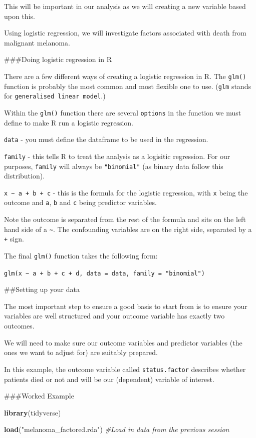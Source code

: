 \documentclass[]{book}
\makeatletter
\newenvironment{Shaded}{\begin{snugshade}}{\end{snugshade}}
\newcommand{\CommentTok}[1]{\textcolor[rgb]{0.56,0.35,0.01}{\textit{#1}}}
\newcommand{\KeywordTok}[1]{\textcolor[rgb]{0.13,0.29,0.53}{\textbf{#1}}}
\newcommand{\NormalTok}[1]{#1}
\newcommand{\StringTok}[1]{\textcolor[rgb]{0.31,0.60,0.02}{#1}}
\newenvironment{kframe}{%
\medskip{}
\setlength{\fboxsep}{.8em}
 \def\at@end@of@kframe{}%
 \ifinner\ifhmode%
  \def\at@end@of@kframe{\end{minipage}}%
  \begin{minipage}{\columnwidth}%
 \fi\fi%
 \def\FrameCommand##1{\hskip\@totalleftmargin \hskip-\fboxsep
 \colorbox{shadecolor}{##1}\hskip-\fboxsep
     \hskip-\linewidth \hskip-\@totalleftmargin \hskip\columnwidth}%
 \MakeFramed {\advance\hsize-\width
   \@totalleftmargin\z@ \linewidth\hsize
   \@setminipage}}%
 {\par\unskip\endMakeFramed%
 \at@end@of@kframe}
\renewenvironment{Shaded}{\begin{kframe}}{\end{kframe}}
\theoremstyle{definition}
\theoremstyle{definition}
\theoremstyle{definition}
\theoremstyle{remark}
\makeatother
\begin{document}
This will be important in our analysis as we will creating a new
variable based upon this.

Using logistic regression, we will investigate factors associated with
death from malignant melanoma.

\#\#\#Doing logistic regression in R

There are a few different ways of creating a logistic regression in R.
The \texttt{glm()} function is probably the most common and most
flexible one to use. (\texttt{glm} stands for
\texttt{generalised\ linear\ model}.)

Within the \texttt{glm()} function there are several \texttt{options} in
the function we must define to make R run a logistic regression.

\texttt{data} - you must define the dataframe to be used in the
regression.

\texttt{family} - this tells R to treat the analysis as a logisitic
regression. For our purposes, \texttt{family} will always be
\texttt{"binomial"} (as binary data follow this distribution).

\texttt{x\ \textasciitilde{}\ a\ +\ b\ +\ c} - this is the formula for
the logistic regression, with \texttt{x} being the outcome and
\texttt{a}, \texttt{b} and \texttt{c} being predictor variables.

Note the outcome is separated from the rest of the formula and sits on
the left hand side of a \texttt{\textasciitilde{}}. The confounding
variables are on the right side, separated by a \texttt{+} sign.

The final \texttt{glm()} function takes the following form:

\texttt{glm(x\ \textasciitilde{}\ a\ +\ b\ +\ c\ +\ d,\ data\ =\ data,\ family\ =\ "binomial")}

\#\#Setting up your data

The most important step to ensure a good basis to start from is to
ensure your variables are well structured and your outcome variable has
exactly two outcomes.

We will need to make sure our outcome variables and predictor variables
(the ones we want to adjust for) are suitably prepared.

In this example, the outcome variable called \texttt{status.factor}
describes whether patients died or not and will be our (dependent)
variable of interest.

\#\#\#Worked Example

\begin{Shaded}
\begin{Highlighting}[]
\KeywordTok{library}\NormalTok{(tidyverse)}

\KeywordTok{load}\NormalTok{(}\StringTok{"melanoma_factored.rda"}\NormalTok{)}
\CommentTok{#Load in data from the previous session}
\end{Highlighting}
\end{Shaded}
\end{document}
